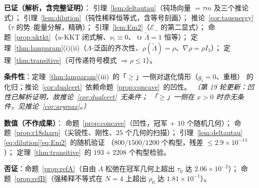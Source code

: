 \documentclass[UTF8,11pt]{ctexart}
\theoremstyle{definition}
\newcommand{\Lam}{\Lambda}
\newcommand{\tr}{\operatorname{tr}}
\begin{document}
\textbf{已证（解析，含完整证明）}：
引理~\ref{lem:deltautau}（钝场向量 $=\tau m$ 及三个推论式）；
引理~\ref{lem:dilution}（钝性稀释恒等式，含等号刻画）；
推论~\ref{cor:tauenergy}（$\tau$ 的势--能量分解，精确）；
引理~\ref{lem:Em2}（$\mathcal E_-$ 的第二显式）；
命题~\ref{prop:uktkt}（$u$-KKT 闭式解、$\nu_i\equiv0$、$\tr\tilde\Lam=1$ 恒等）；
定理~\ref{thm:lamparam}(i)(ii)（$\Lam$-泛函的齐次性、$\rho(\tilde\Lam)=\rho$、$\nabla\rho=\rho I_3$）；
定理~\ref{thm:transitive}（可传递符号模式 $\Rightarrow\rho\le1$）。

\textbf{条件性}：定理~\ref{thm:lamparam}(iii)~的「$\ge$」一侧对退化情形（$g_i=0$、重根）
的化归；推论~\ref{cor:dualcert}~依赖命题~\ref{prop:concave}~的凹性。
\emph{（第 19 轮更新：凹性已解析证明，故推论~\ref{cor:dualcert}~无条件；
「$\ge$」一侧在 $x>0$ 时亦无条件，见推论~\ref{cor:argmax}。）}

\textbf{数值（不作成果）}：
命题~\ref{prop:concave}（凹性，冠军 $+$ $10$ 个随机几何）；
命题~\ref{prop:r18sharp}（尖锐性、刚性、$25$ 个几何的扫描）；
引理~\ref{lem:deltautau}\eqref{eq:dilution}\eqref{eq:Em2}~的随机验证
（$800/1500/1200$ 个构型，残差 $\le2.9\times10^{-14}$）；
定理~\ref{thm:transitive}~的 $193+2208$ 个构型检验。

\textbf{否证}：命题~\ref{prop:refA}（自由 $\Lam$ 松弛在冠军几何上超出 $\tau_0$ 达 $2.06\times10^{-2}$）；
命题~\ref{prop:refB}（强稀释不等式在 $N=4$ 上超出 $\rho_0$ 达 $1.81\times10^{-1}$）。
\end{document}
